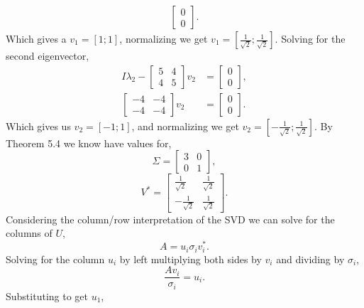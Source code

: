 \documentclass[12pt]{article}
\makeatletter
\theoremstyle{homework}
\newenvironment{exercise}[1]
{\def\@currentlabel{#1}\exercisecore}
{\endexercisecore}
\makeatother
\begin{document}
\begin{exercise}{P10}
\begin{enumerate}
\begin{align*}
\begin{bmatrix}
        0 \\
        0 
      \end{bmatrix}.
  \end{align*}
  Which gives a $v_1 = [1;1]$, normalizing we get $v_1 = [\frac{1}{\sqrt{2}};\frac{1}{\sqrt{2}}]$. Solving 
  for the second eigenvector, 
  \begin{align*}
    I\lambda_2 - 
    \begin{bmatrix}
      5 & 4\\
      4 & 5
    \end{bmatrix}v_2 &= 
    \begin{bmatrix}
      0 \\
      0 
    \end{bmatrix},\\
    \begin{bmatrix}
      -4 & -4\\
      -4 & -4
    \end{bmatrix}v_2 &= 
      \begin{bmatrix}
        0 \\
        0 
      \end{bmatrix}.
  \end{align*}
  Which gives us $v_2 = [-1;1]$, and normalizing we get $v_2 = [-\frac{1}{\sqrt{2}};\frac{1}{\sqrt{2}}]$.
  By Theorem 5.4 we know have values for, 
  \begin{equation*}
    \Sigma = 
    \begin{bmatrix}
      3 & 0\\
      0 & 1
    \end{bmatrix},
  \end{equation*}
  \begin{equation*}
    V^* = 
    \begin{bmatrix}
      \frac{1}{\sqrt{2}} & \frac{1}{\sqrt{2}}\\
      -\frac{1}{\sqrt{2}} & \frac{1}{\sqrt{2}}
    \end{bmatrix}.
  \end{equation*}
  Considering the column/row interpretation of the SVD we can solve for the columns of $U$,
  \begin{equation*}
    A = u_i \sigma_i v^*_i.
  \end{equation*}
  Solving for the column $u_i$ by left multiplying both sides by $v_i$ and dividing by $\sigma_i$,
  \begin{equation*}
   \dfrac{Av_i}{\sigma_i} = u_i. 
  \end{equation*}
  Substituting to get $u_1$,

\end{enumerate}
\end{exercise}
\end{document}
